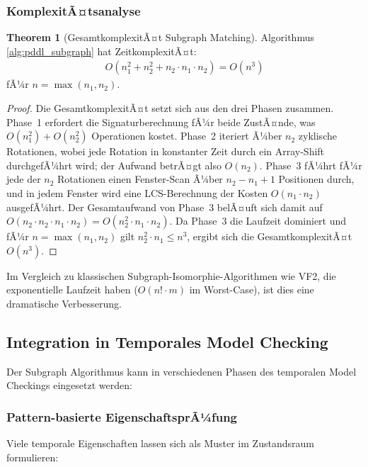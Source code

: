 ﻿\documentclass[a4paper,12pt]{article}
\theoremstyle{definition}
\newtheorem{theorem}{Theorem}[section]
\begin{document}
\subsubsection{KomplexitÃ¤tsanalyse}

\begin{theorem}[GesamtkomplexitÃ¤t Subgraph Matching]
	Algorithmus \ref{alg:pddl_subgraph} hat ZeitkomplexitÃ¤t:
	\begin{align}
	O(n_1^2 + n_2^2 + n_2 \cdot n_1 \cdot n_2) = O(n^3)
	\end{align}
	fÃ¼r $n = \max(n_1, n_2)$.
\end{theorem}

\begin{proof}
	Die GesamtkomplexitÃ¤t setzt sich aus den drei Phasen zusammen. Phase~1 erfordert die Signaturberechnung fÃ¼r beide ZustÃ¤nde, was $O(n_1^2) + O(n_2^2)$ Operationen kostet. Phase~2 iteriert Ã¼ber $n_2$ zyklische Rotationen, wobei jede Rotation in konstanter Zeit durch ein Array-Shift durchgefÃ¼hrt wird; der Aufwand betrÃ¤gt also $O(n_2)$. Phase~3 fÃ¼hrt fÃ¼r jede der $n_2$ Rotationen einen Fenster-Scan Ã¼ber $n_2 - n_1 + 1$ Positionen durch, und in jedem Fenster wird eine LCS-Berechnung der Kosten $O(n_1 \cdot n_2)$ ausgefÃ¼hrt. Der Gesamtaufwand von Phase~3 belÃ¤uft sich damit auf $O(n_2 \cdot n_2 \cdot n_1 \cdot n_2) = O(n_2^2 \cdot n_1 \cdot n_2)$. Da Phase~3 die Laufzeit dominiert und fÃ¼r $n = \max(n_1, n_2)$ gilt $n_2^2 \cdot n_1 \leq n^3$, ergibt sich die GesamtkomplexitÃ¤t $O(n^3)$.
\end{proof}

Im Vergleich zu klassischen Subgraph-Isomorphie-Algorithmen wie VF2, die exponentielle Laufzeit haben ($O(n! \cdot m)$ im Worst-Case), ist dies eine dramatische Verbesserung.

\subsection{Integration in Temporales Model Checking}

Der Subgraph Algorithmus kann in verschiedenen Phasen des temporalen Model Checkings eingesetzt werden:

\subsubsection{Pattern-basierte EigenschaftsprÃ¼fung}

Viele temporale Eigenschaften lassen sich als Muster im Zustandsraum formulieren:
\end{document}
